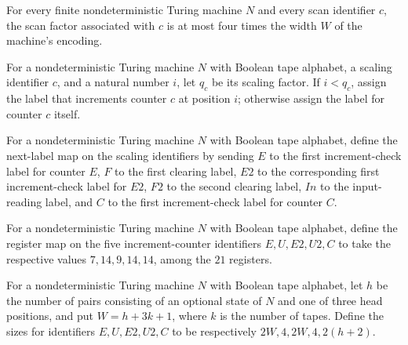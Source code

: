 \begin{lemma}
\label{Complexity.Codec.scFactor_le}
\leanok
{}
For every finite nondeterministic Turing machine $N$ and every scan identifier $c$, the
scan factor associated with $c$ is at most four times the width $W$ of the machine's
encoding.
\end{lemma}

\begin{definition}
\label{Complexity.Codec.scIncs}
\leanok
{}
For a nondeterministic Turing machine $N$ with Boolean tape alphabet, a scaling
identifier $c$, and a natural number $i$, let $q_c$ be its scaling factor. If $i<q_c$,
assign the label that increments counter $c$ at position $i$; otherwise assign the label
for counter $c$ itself.
\end{definition}

\begin{definition}
\label{Complexity.Codec.scNext}
\leanok
{}
For a nondeterministic Turing machine $N$ with Boolean tape alphabet, define the
next-label map on the scaling identifiers by sending $E$ to the first increment-check
label for counter $E$, $F$ to the first clearing label, $E2$ to the corresponding first
increment-check label for $E2$, $F2$ to the second clearing label, $In$ to the
input-reading label, and $C$ to the first increment-check label for counter $C$.
\end{definition}

\begin{definition}
\label{Complexity.Codec.icReg}
\leanok
{}
For a nondeterministic Turing machine $N$ with Boolean tape alphabet, define the
register map on the five increment-counter identifiers $E,U,E2,U2,C$ to take the
respective values $7,14,9,14,14$, among the $21$ registers.
\end{definition}

\begin{definition}
\label{Complexity.Codec.icCount}
\leanok
{}
For a nondeterministic Turing machine $N$ with Boolean tape alphabet, let $h$ be the
number of pairs consisting of an optional state of $N$ and one of three head positions,
and put $W=h+3k+1$, where $k$ is the number of tapes. Define the sizes for identifiers
$E,U,E2,U2,C$ to be respectively $2W,4,2W,4,2(h+2)$.
\end{definition}

